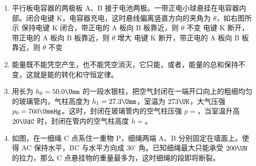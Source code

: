 \documentclass[\gkver]{gaokaozhenti}
\begin{document}
\begin{enumerate}

\item
平行板电容器的两极板 A、B 接于电池两极。一带正电小球悬挂在电容器内部。闭合电键 K，电容器充电，这时悬线偏离竖直方向的夹角为 $\theta$，如右图所示
\onepicture[h=5.76cm]{}
{保持电键 K 闭合，带正电的 A 板向 B 板靠近，则 $\theta$ 不变}
{电键 K 断开，带正电的 A 板向 B 板靠近，则 $\theta$ 增大}
{电键 K 断开，带正电的 A 板向 B 板靠近，则 $\theta$ 不变}


\item
能量既不能凭空产生，也不能凭空消灭，它只能，或者，能量的总和保持不变，这就是能的转化和守恒定律。


\item
用长为 $h_{0}=50.0\Umm$ 的一段水银柱，把空气封闭在一端开口向上的粗细均匀的玻璃管内，气柱高度为 $h_{1}=27.3\Umm$，室温为 $273\UK$，大气压强 $p_{0}=760\UmmHg$。这时，封闭在玻璃管内的空气柱压强 $p=$\tkanswer{$810\UmmHg$}，当室温升高 $20\UdC$ 时，封闭在管内的空气柱高度 $h=$\tkanswer{$29.3\Umm$}。


\item
如图，在一细绳 C 点系住一重物 P，细绳两端 A、B 分别固定在墙面上。使得 AC 保持水平，BC 与水平方向成 $30^{\circ}$ 角。已知细绳最大只能承受 $200\UN$ 的拉力，那么 C 点悬挂物的重量最多为\tkanswer{$100\UN$}，这时细绳的段即将断裂。
\onepicture[align=right, w=4.38cm]{}


\end{enumerate}
\end{document}
